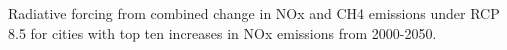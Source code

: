 Radiative forcing from combined change in NOx and CH4 emissions under RCP 8.5 for cities with top ten increases in NOx emissions from 2000-2050.~\label{fig:tsrfcomb85}
